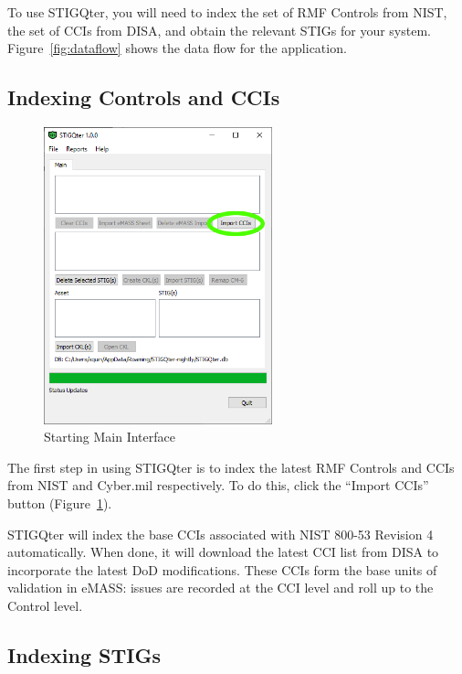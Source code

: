 \documentclass[letterpaper, 10pt, twoside]{article}
\begin{document}
To use STIGQter, you will need to index the set of RMF Controls from NIST, the set of CCIs from DISA, and obtain the relevant STIGs for your system. Figure~\ref{fig:dataflow} shows the data flow for the application.

\clearpage
\subsection{Indexing Controls and CCIs}
\begin{figure}
	\centering
	\vspace{-10pt}
	\includegraphics[width=0.59\textwidth]{images/main-01.png}
	\caption{Starting Main Interface}
	\vspace{-30pt}
	\label{fig:importccis}
\end{figure}


The first step in using STIGQter is to index the latest RMF Controls and CCIs from NIST and Cyber.mil respectively. To do this, click the ``Import CCIs'' button (Figure~\ref{fig:importccis}).

STIGQter will index the base CCIs associated with NIST 800-53 Revision 4 automatically. When done, it will download the latest CCI list from DISA to incorporate the latest DoD modifications. These CCIs form the base units of validation in eMASS: issues are recorded at the CCI level and roll up to the Control level.

\subsection{Indexing STIGs}
\end{document}
